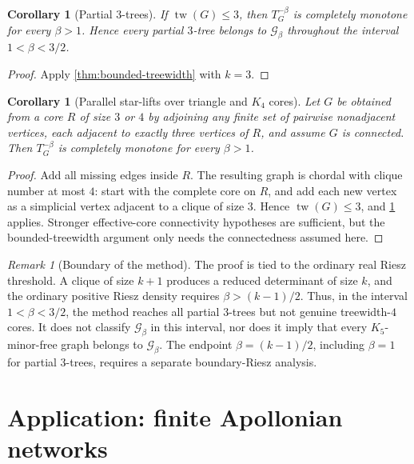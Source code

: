 \documentclass[preprint,12pt,authoryear]{elsarticle}
\numberwithin{equation}{section}
\newtheorem{corollary}[theorem]{Corollary}
\theoremstyle{definition}
\theoremstyle{remark}
\newtheorem{remark}[theorem]{Remark}
\newcommand{\calG}{\mathcal{G}}
\newcommand{\1}{\mathbf{1}}
\newcommand{\tw}{\operatorname{tw}}
\begin{document}
\begin{corollary}[Partial \(3\)-trees]
\label{cor:partial-3-trees}
If \(\tw(G)\le3\), then \(T_G^{-\beta}\) is completely monotone for every \(\beta>1\).  Hence every partial \(3\)-tree belongs to \(\calG_\beta\) throughout the interval \(1<\beta<3/2\).
\end{corollary}

\begin{proof}
Apply \cref{thm:bounded-treewidth} with \(k=3\).
\end{proof}

\begin{corollary}[Parallel star-lifts over triangle and \(K_4\) cores]
\label{cor:parallel-star-lifts}
Let \(G\) be obtained from a core \(R\) of size \(3\) or \(4\) by adjoining any finite set of pairwise nonadjacent vertices, each adjacent to exactly three vertices of \(R\), and assume \(G\) is connected.  Then \(T_G^{-\beta}\) is completely monotone for every \(\beta>1\).
\end{corollary}

\begin{proof}
Add all missing edges inside \(R\).  The resulting graph is chordal with clique number at most \(4\): start with the complete core on \(R\), and add each new vertex as a simplicial vertex adjacent to a clique of size \(3\).  Hence \(\tw(G)\le3\), and \cref{cor:partial-3-trees} applies.  Stronger effective-core connectivity hypotheses are sufficient, but the bounded-treewidth argument only needs the connectedness assumed here.
\end{proof}

\begin{remark}[Boundary of the method]
\label{rem:method-boundary}
The proof is tied to the ordinary real Riesz threshold.  A clique of size \(k+1\) produces a reduced determinant of size \(k\), and the ordinary positive Riesz density requires \(\beta>(k-1)/2\).  Thus, in the interval \(1<\beta<3/2\), the method reaches all partial \(3\)-trees but not genuine treewidth-\(4\) cores.  It does not classify \(\calG_\beta\) in this interval, nor does it imply that every \(K_5\)-minor-free graph belongs to \(\calG_\beta\).  The endpoint \(\beta=(k-1)/2\), including \(\beta=1\) for partial \(3\)-trees, requires a separate boundary-Riesz analysis.
\end{remark}

\section{Application: finite Apollonian networks}
\label{sec:apollonian}
\end{document}
